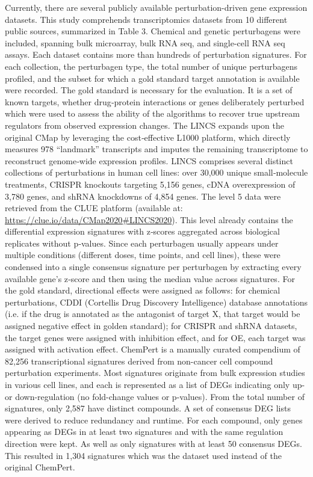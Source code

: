 Currently, there are several publicly available perturbation-driven gene expression datasets. This study comprehends transcriptomics datasets from 10 different public sources, summarized in Table 3. Chemical and genetic perturbagens were included, spanning bulk microarray, bulk RNA seq, and single-cell RNA seq assays. Each dataset contains more than hundreds of perturbation signatures. For each collection, the perturbagen type, the total number of unique perturbagens profiled, and the subset for which a gold standard target annotation is available were recorded. The gold standard is necessary for the evaluation. It is a set of known targets, whether drug‐protein interactions or genes deliberately perturbed which were used to assess the ability of the algorithms to recover true upstream regulators from observed expression changes. 
The LINCS expands upon the original CMap by leveraging the cost‐effective L1000 platform, which directly measures 978 “landmark” transcripts and imputes the remaining transcriptome to reconstruct genome‐wide expression profiles. LINCS comprises several distinct collections of perturbations in human cell lines: over 30,000 unique small‐molecule treatments, CRISPR knockouts targeting 5,156 genes, cDNA overexpression of 3,780 genes, and shRNA knockdowns of 4,854 genes. The level 5 data were retrieved from the CLUE platform (available at: \url{https://clue.io/data/CMap2020#LINCS2020}). This level already contains the differential expression signatures with z‐scores aggregated across biological replicates without p‐values. Since each perturbagen usually appears under multiple conditions (different doses, time points, and cell lines), these were condensed into a single consensus signature per perturbagen by extracting every available gene’s z‐score and then using the median value across signatures. For the gold standard, directional effects were assigned as follows: for chemical perturbations, CDDI (Cortellis Drug Discovery Intelligence) database annotations (i.e. if the drug is annotated as the antagonist of target X, that target would be assigned negative effect in golden standard); for CRISPR and shRNA datasets, the target genes were assigned with inhibition effect, and for OE, each target was assigned with activation effect.
ChemPert is a manually curated compendium of 82,256 transcriptional signatures derived from non-cancer cell compound perturbation experiments. Most signatures originate from bulk expression studies in various cell lines, and each is represented as a list of DEGs indicating only up- or down-regulation (no fold-change values or p-values). From the total number of signatures, only 2,587 have distinct compounds. A set of consensus DEG lists were derived to reduce redundancy and runtime. For each compound, only genes appearing as DEGs in at least two signatures and with the same regulation direction were kept. As well as only signatures with at least 50 consensus DEGs. This resulted in 1,304 signatures which was the dataset used instead of the original ChemPert.
